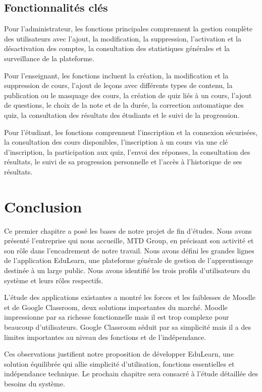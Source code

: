 \documentclass[12pt,a4paper]{report}
\begin{document}
\subsection{Fonctionnalités clés}
Pour l'administrateur, les fonctions principales comprennent la gestion complète des utilisateurs avec l'ajout, la modification, la suppression, l'activation et la désactivation des comptes, la consultation des statistiques générales et la surveillance de la plateforme.

Pour l'enseignant, les fonctions incluent la création, la modification et la suppression de cours, l'ajout de leçons avec différents types de contenu, la publication ou le masquage des cours, la création de quiz liés à un cours, l'ajout de questions, le choix de la note et de la durée, la correction automatique des quiz, la consultation des résultats des étudiants et le suivi de la progression.

Pour l'étudiant, les fonctions comprennent l'inscription et la connexion sécurisées, la consultation des cours disponibles, l'inscription à un cours via une clé d'inscription, la participation aux quiz, l'envoi des réponses, la consultation des résultats, le suivi de sa progression personnelle et l'accès à l'historique de ses résultats.

\section{Conclusion}
Ce premier chapitre a posé les bases de notre projet de fin d'études. Nous avons présenté l'entreprise qui nous accueille, MTD Group, en précisant son activité et son rôle dans l'encadrement de notre travail. Nous avons défini les grandes lignes de l'application EduLearn, une plateforme générale de gestion de l'apprentissage destinée à un large public. Nous avons identifié les trois profils d'utilisateurs du système et leurs rôles respectifs.

L'étude des applications existantes a montré les forces et les faiblesses de Moodle et de Google Classroom, deux solutions importantes du marché. Moodle impressionne par sa richesse fonctionnelle mais il est trop complexe pour beaucoup d'utilisateurs. Google Classroom séduit par sa simplicité mais il a des limites importantes au niveau des fonctions et de l'indépendance.

Ces observations justifient notre proposition de développer EduLearn, une solution équilibrée qui allie simplicité d'utilisation, fonctions essentielles et indépendance technique. Le prochain chapitre sera consacré à l'étude détaillée des besoins du système.
\end{document}

